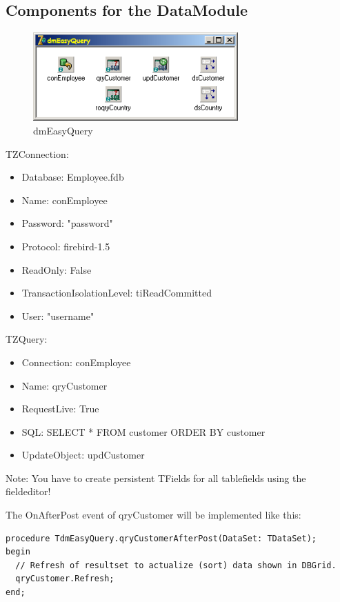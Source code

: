 \documentclass[a4paper,12pt,oneside]{book}
\begin{document}
\subsection{Components for the DataModule}
\begin{figure}[htbp] 
  \centering
  \includegraphics[width=0.7\textwidth]{ZeosTutorial/dmEasyQuery.png}
  \caption{dmEasyQuery}
  \label{fig:dmEasyQuery}
\end{figure}

TZConnection:
\begin{itemize}
  \item Database: Employee.fdb
  \item Name: conEmployee
  \item Password: "password"
  \item Protocol: firebird-1.5
  \item ReadOnly: False
  \item TransactionIsolationLevel: tiReadCommitted
  \item User: "username"
\end{itemize}

TZQuery:
\begin{itemize}
  \item Connection: conEmployee
  \item Name: qryCustomer
  \item RequestLive: True
  \item SQL: SELECT * FROM customer ORDER BY customer
  \item UpdateObject: updCustomer
\end{itemize}

Note: You have to create persistent TFields for all tablefields using the fieldeditor!

The OnAfterPost event of qryCustomer will be implemented like this:
\begin{verbatim}
procedure TdmEasyQuery.qryCustomerAfterPost(DataSet: TDataSet);
begin
  // Refresh of resultset to actualize (sort) data shown in DBGrid.
  qryCustomer.Refresh;
end;
\end{verbatim}
\end{document}
